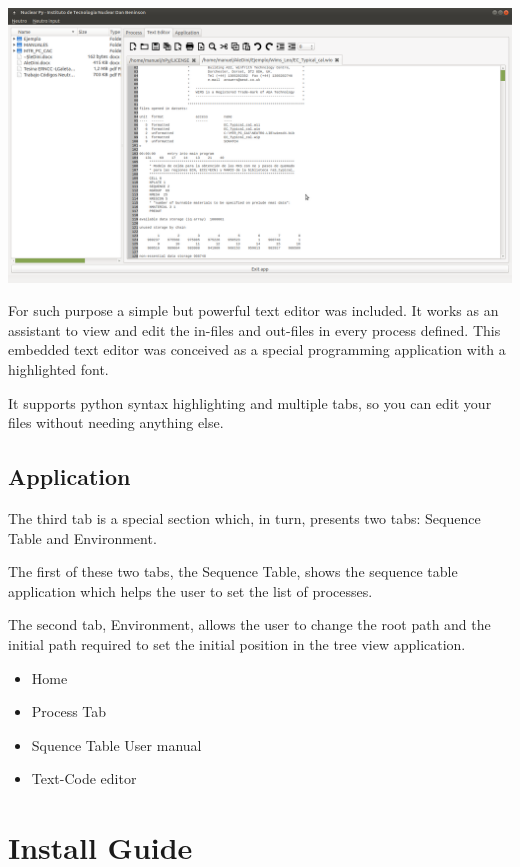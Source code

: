 \documentclass[a4paper,10pt]{article}
\begin{document}
\begin{center}
 \includegraphics[width=\textwidth]{img/textEditor.png}
\end{center}

For such purpose a simple but powerful text editor was included. It works as an assistant to view and edit the in-files and out-files in every process defined. This embedded text editor was conceived as a special programming application with a highlighted font.

It supports python syntax highlighting and multiple tabs, so you can edit your files without needing anything else.

\subsection{Application}

The third tab is a special section which, in turn, presents two tabs: Sequence Table and Environment.

The first of these two tabs, the Sequence Table, shows the sequence table application which helps the user to set the list of processes.

The second tab, Environment, allows the user to change the root path and the initial path required to set the initial position in the tree view application.

\begin{itemize}
 \item Home
 \item Process Tab
 \item Squence Table User manual
 \item Text-Code editor
\end{itemize}

\section{Install Guide}
\end{document}
